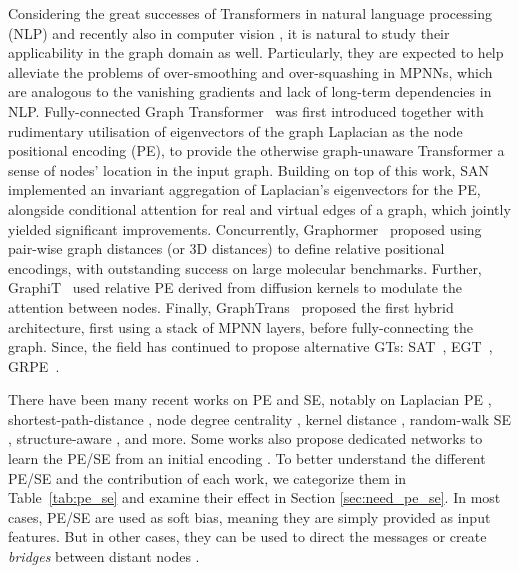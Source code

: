 \documentclass{article}
\begin{document}
Considering the great successes of Transformers in natural language processing (NLP) \cite{vaswani2017attention, kalyan2021ammus_transformer_survey} and recently also in computer vision \cite{dascoli2021convit, han2022survey_vision_transformer, guo2021cmt}, it is natural to study their applicability in the graph domain as well. Particularly, they are expected to help alleviate the problems of over-smoothing and over-squashing \cite{alon2021on, topping2021understanding_ricci} in MPNNs, which are analogous to the vanishing gradients and lack of long-term dependencies in NLP. Fully-connected Graph Transformer~\cite{dwivedi2020generalization} was first introduced together with rudimentary utilisation of eigenvectors of the graph Laplacian as the node positional encoding (PE), to provide the otherwise graph-unaware Transformer a sense of nodes' location in the input graph.
Building on top of this work, SAN~\cite{kreuzer2021rethinking} implemented an invariant aggregation of Laplacian's eigenvectors for the PE, alongside conditional attention for real and virtual edges of a graph, which jointly yielded significant improvements.
Concurrently, Graphormer~\cite{ying2021graphormer,shi2022benchgraphormer} proposed using pair-wise graph distances (or 3D distances) to define relative positional encodings, with outstanding success on large molecular benchmarks.
Further, GraphiT~\cite{mialon2021graphit} used relative PE derived from diffusion kernels to modulate the attention between nodes. Finally, GraphTrans~\cite{jain2021graphtrans} proposed the first hybrid architecture, first using a stack of MPNN layers, before fully-connecting the graph.
Since, the field has continued to propose alternative GTs: SAT~\cite{chen2022SAT}, EGT~\cite{hussain2022EGT}, GRPE~\cite{park2022GRPE}.

There have been many recent works on PE and SE, notably on Laplacian PE \cite{dwivedi2020generalization,kreuzer2021rethinking, beaini2021directional_dgn,wang2022equivstable,lim2022sign}, shortest-path-distance \cite{li2020distance,ying2021graphormer}, node degree centrality \cite{ying2021graphormer}, kernel distance \cite{mialon2021graphit}, random-walk SE \cite{dwivedi2022LPE}, structure-aware \cite{chen2022SAT, bouritsas2022improving_GSN,bodnar2021weisfeiler_CIN}, and more. Some works also propose dedicated networks to learn the PE/SE from an initial encoding \cite{kreuzer2021rethinking, dwivedi2022LPE, lim2022sign, chen2022SAT}. To better understand the different PE/SE and the contribution of each work, we categorize them in Table~\ref{tab:pe_se} and examine their effect in Section \ref{sec:need_pe_se}. In most cases, PE/SE are used as soft bias, meaning they are simply provided as input features. But in other cases, they can be used to direct the messages \cite{beaini2021directional_dgn} or create \textit{bridges} between distant nodes \cite{koutis2019spectral, topping2021understanding_ricci}.
\end{document}
